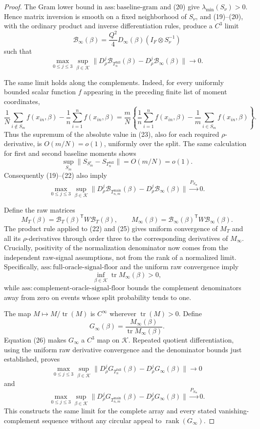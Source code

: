 \documentclass{article}
\begin{document}
\begin{proof}
The Gram lower bound in \(\mathrm{ass{:}baseline\text{-}gram}\) and (20) give
\(\lambda_{\min}(S_\nu)>0\).  Hence matrix inversion is smooth on a fixed neighborhood of \(S_\nu\), and (19)--(20), with the ordinary product and inverse differentiation rules, produce a \(C^3\) limit
\[
\mathcal B_\infty(\beta)
=\frac{Q^2}{4}D_\infty(\beta)(I_F\otimes S_\nu^{-1})
\tag{21}
\]
such that
\[
\max_{0\leq j\leq3}\sup_{\beta\in\mathcal K}
\|D_\rho^j\mathcal B_{T_n^{\mathrm{full}}}(\beta)
-D_\rho^j\mathcal B_\infty(\beta)\|\to0.
\tag{22}
\]

The same limit holds along the complements.  Indeed, for every uniformly bounded scalar function \(f\) appearing in the preceding finite list of moment coordinates,
\[
\frac1N\sum_{i\notin S_m}f(x_{in},\beta)
-\frac1n\sum_{i=1}^nf(x_{in},\beta)
=\frac mN\left\{
\frac1n\sum_{i=1}^nf(x_{in},\beta)
-\frac1m\sum_{i\in S_m}f(x_{in},\beta)
\right\}.
\tag{23}
\]
Thus the supremum of the absolute value in (23), also for each required \(\rho\)-derivative, is \(O(m/N)=o(1)\), uniformly over the split.  The same calculation for first and second baseline moments shows
\[
\sup_{S_m}\|S_{S_m^c}-S_{T_n^{\mathrm{full}}}\|=O(m/N)=o(1).
\tag{24}
\]
Consequently (19)--(22) also imply
\[
\max_{0\leq j\leq3}\sup_{\beta\in\mathcal K}
\|D_\rho^j\mathcal B_{T_{n,m}^{\mathrm{main}}}(\beta)
-D_\rho^j\mathcal B_\infty(\beta)\|
\xrightarrow{P_{S_m}}0.
\tag{25}
\]

Define the raw matrices
\[
M_T(\beta)=\mathcal B_T(\beta)^{\mathsf T}W\mathcal B_T(\beta),
\qquad
M_\infty(\beta)=\mathcal B_\infty(\beta)^{\mathsf T}
W\mathcal B_\infty(\beta).
\]
The product rule applied to (22) and (25) gives uniform convergence of \(M_T\) and all its \(\rho\)-derivatives through order three to the corresponding derivatives of \(M_\infty\).  Crucially, positivity of the normalization denominator now comes from the independent raw-signal assumptions, not from the rank of a normalized limit.  Specifically,
\(\mathrm{ass{:}full\text{-}oracle\text{-}signal\text{-}floor}\) and the uniform raw convergence imply
\[
\inf_{\beta\in\mathcal K}\operatorname{tr}M_\infty(\beta)>0,
\tag{26}
\]
while \(\mathrm{ass{:}complement\text{-}oracle\text{-}signal\text{-}floor}\) bounds the complement denominators away from zero on events whose split probability tends to one.

The map \(M\mapsto M/\operatorname{tr}(M)\) is \(C^\infty\) wherever
\(\operatorname{tr}(M)>0\).  Define
\[
G_\infty(\beta)=
\frac{M_\infty(\beta)}{\operatorname{tr}M_\infty(\beta)}.
\]
Equation (26) makes \(G_\infty\) a \(C^3\) map on \(\mathcal K\).  Repeated quotient differentiation, using the uniform raw derivative convergence and the denominator bounds just established, proves
\[
\max_{0\leq j\leq3}\sup_{\beta\in\mathcal K}
\|D_\rho^jG_{T_n^{\mathrm{full}}}(\beta)
-D_\rho^jG_\infty(\beta)\|\to0
\]
and
\[
\max_{0\leq j\leq3}\sup_{\beta\in\mathcal K}
\|D_\rho^jG_{T_{n,m}^{\mathrm{main}}}(\beta)
-D_\rho^jG_\infty(\beta)\|
\xrightarrow{P_{S_m}}0.
\]
This constructs the same limit for the complete array and every stated vanishing-complement sequence without any circular appeal to \(\operatorname{rank}(G_\infty)\).
\end{proof}
\end{document}
